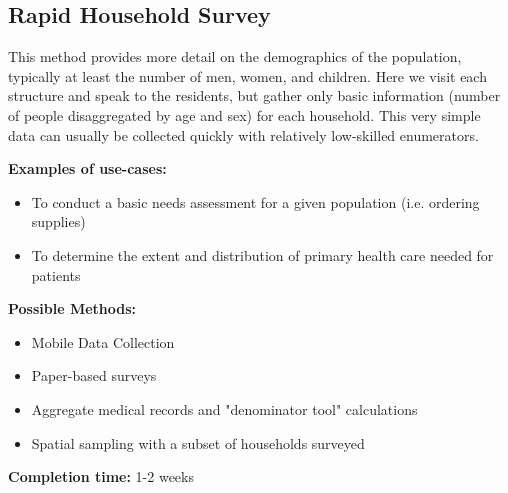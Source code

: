 \documentclass[a4paper,12pt,twoside]{article}
\begin{document}
\newpage
\subsection{Rapid Household Survey}
This method provides more detail on the demographics of the population, typically at least the number of men, women, and children. Here we visit each structure and speak to the residents, but gather only basic information (number of people disaggregated by age and sex) for each household. This very simple data can usually be collected quickly with relatively low-skilled enumerators.

\noindent
\textbf{Examples of use-cases:}

\begin{itemize}
    \item To conduct a basic needs assessment for a given population (i.e. ordering supplies)
    \item To determine the extent and distribution of primary health care needed for patients
\end{itemize}

\noindent
\textbf{Possible Methods:}
\begin{itemize}
    \item Mobile Data Collection
    \item Paper-based surveys
    \item Aggregate medical records and "denominator tool" calculations
    \item Spatial sampling with a subset of households surveyed
\end{itemize}

\noindent
\textbf{Completion time:} 1-2 weeks
\end{document}

